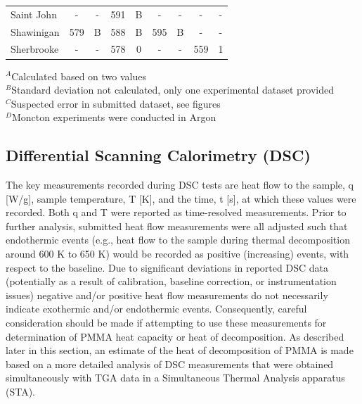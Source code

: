 \documentclass{book}
\begin{document}
\begin{table}[ht]
\begin{center}
\begin{tabular}{|l|cc|cc|cc|cc|}
Saint John              & -           & -               & 591            & B                & -          & -                 & -           & -                     \\
Shawinigan              & 579         & B               & 588            & B                & 595        & B                 & -           & -                     \\
Sherbrooke              & -           & -               & 578            & 0                & -          & -                 & 559         & 1                     \\  \hline
\end{tabular}
\end{center}
$^A$Calculated based on two values \\
$^B$Standard deviation not calculated, only one experimental dataset provided \\
$^C$Suspected error in submitted dataset, see figures \\
$^D$Moncton experiments were conducted in Argon
\end{table}



\subsection{Differential Scanning Calorimetry (DSC)}

The key measurements recorded during DSC tests are heat flow to the sample, q [W/g], sample temperature, T [K], and the time, t [s], at which these values were recorded.  Both q and T were reported as time-resolved measurements. Prior to further analysis, submitted heat flow measurements were all adjusted such that endothermic events (e.g., heat flow to the sample during thermal decomposition around 600 K to 650 K) would be recorded as positive (increasing) events, with respect to the baseline. Due to significant deviations in reported DSC data (potentially as a result of calibration, baseline correction, or instrumentation issues) negative and/or positive heat flow measurements do not necessarily indicate exothermic and/or endothermic events. Consequently, careful consideration should be made if attempting to use these measurements for determination of PMMA heat capacity or heat of decomposition. As described later in this section, an estimate of the heat of decomposition of PMMA is made based on a more detailed analysis of DSC measurements that were obtained simultaneously with TGA data in a Simultaneous Thermal Analysis apparatus (STA).
\end{document}
